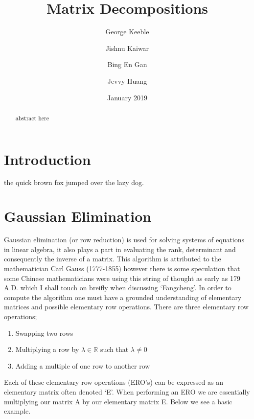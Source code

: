 \documentclass[12pt,reqno,twoside,titlepage]{article}
\theoremstyle{definition}
\begin{document}
\title{Matrix Decompositions}
\author{George Keeble
  \and
  Jishnu Kaiwar
  \and
  Bing En Gan
  \and
  Jevvy Huang
}
\date{January 2019}

\maketitle

\begin{abstract}
  abstract here
\end{abstract}

\section{Introduction}
\label{sec:int}
the quick brown fox jumped over the lazy dog.
\newpage
\section{Gaussian Elimination}
\label{sec:gaus}

Gaussian elimination (or row reduction) is used for solving systems of equations in linear algebra, it also plays a part in evaluating the rank, determinant and consequently the inverse of a matrix.
This algorithm is attributed to the mathematician Carl Gauss (1777-1855) however there is some speculation that some Chinese mathematicians were using this string of thought as early as 179 A.D. which I shall touch on breifly when discussing ‘Fangcheng’.
In order to compute the algorithm one must have a grounded understanding of elementary matrices and possible elementary row operations.
There are three elementary row operations;

\begin{enumerate}
\item Swapping two rows
\item Multiplying a row by $\lambda \in \mathbb{R}$ such that $\lambda \ne 0$
\item Adding a multiple of one row to another row
\end{enumerate}

Each of these elementary row operations (ERO’s) can be expressed as an elementary matrix often denoted ‘E’. When performing an ERO we are essentially multiplying our matrix A by our elementary matrix E. Below we see a basic example.
\end{document}
